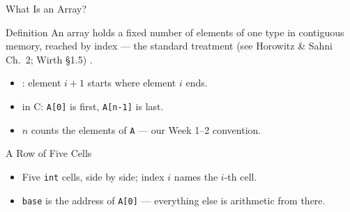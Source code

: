\documentclass[aspectratio=169]{beamer}
\begin{document}
\begin{frame}{What Is an Array?}
  \begin{block}{Definition}
    An array holds a fixed number of elements of one type in contiguous
    memory, reached by index --- the standard treatment (see Horowitz \&
    Sahni Ch.~2; Wirth \S1.5)
    \cite{HorowitzSahni2008_fundamentals_data_structures,Wirth2004_algorithms_data_structures}.
  \end{block}
  \begin{itemize}
    \item {}: element $i+1$ starts where element $i$ ends.
    \item {} in C: \texttt{A[0]} is first, \texttt{A[n-1]} is last.
    \item $n$ counts the elements of \texttt{A} --- our Week 1--2 convention.
  \end{itemize}
\end{frame}

\begin{frame}{A Row of Five Cells}
  \begin{center}
  \end{center}
  \begin{itemize}
    \item Five \texttt{int} cells, side by side; index $i$ names the $i$-th cell.
    \item \texttt{base} is the address of \texttt{A[0]} --- everything else is
      arithmetic from there.
  \end{itemize}
\end{frame}
\end{document}
